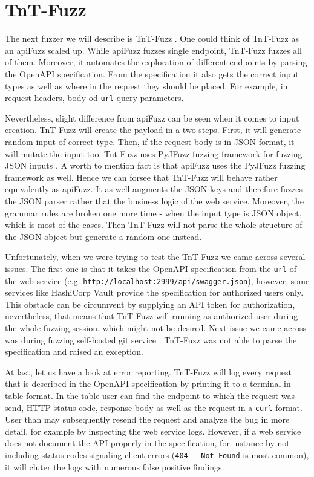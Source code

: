 \section{TnT-Fuzz}
\label{sec:tnt-fuzz}
The next fuzzer we will describe is TnT-Fuzz \cite{tntFuzzer2020github}. One could think of  TnT-Fuzz as an apiFuzz scaled up. While apiFuzz fuzzes single endpoint, TnT-Fuzz fuzzes all of them. Moreover, it automates the exploration of different endpoints by parsing the OpenAPI specification. From the specification it also gets the correct input types as well as where in the request they should be placed. For example, in request headers, body od \texttt{url} query parameters.

Nevertheless, slight difference from apiFuzz can be seen when it comes to input creation. TnT-Fuzz will create the payload in a two steps. First, it will generate random input of correct type. Then, if the request body is in JSON format, it will mutate the input too. Tnt-Fuzz uses PyJFuzz fuzzing framework for fuzzing JSON inputs \cite{pyjfuzz2020github}. A worth to mention fact is that apiFuzz uses the PyJFuzz fuzzing framework as well. Hence we can forsee that TnT-Fuzz will behave rather equivalently as apiFuzz. It as well augments the JSON keys and therefore fuzzes the JSON parser rather that the business logic of the web service. Moreover, the grammar rules are broken one more time - when the input type is JSON object, which is most of the cases. Then TnT-Fuzz will not parse the whole structure of the JSON object but generate a random one instead.

Unfortunately, when we were trying to test the TnT-Fuzz we came across several issues. The first one is that it takes the OpenAPI specification from the \texttt{url} of the web service (e.g. \texttt{http://localhost:2999/api/swagger.json}), however, some services like HashiCorp Vault \cite{vault2020github} provide the specification for authorized users only. This obstacle can be circumvent by supplying an API token for authorization, nevertheless, that means that TnT-Fuzz will running as authorized user during the whole fuzzing session, which might not be desired. Next issue we came across was during fuzzing self-hosted git service \cite{gitea2020web}. TnT-Fuzz was not able to parse the specification and raised an exception.

At last, let us have a look at error reporting. TnT-Fuzz will log every request that is described in the OpenAPI specification by printing it to a terminal in table format. In the table user can find the endpoint to which the request was send, HTTP status code, response body as well as the request in a \texttt{curl} format. User than may subsequently resend the request and analyze the bug in more detail, for example by inspecting the web service logs. However, if a web service does not document the API properly in the specification, for instance by not including status codes signaling client errors (\texttt{404 - Not Found} is most common), it will cluter the logs with numerous false positive findings.


